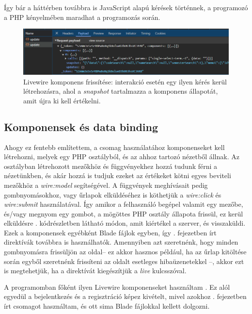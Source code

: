 \documentclass[
]{thesis-ekf}
\theoremstyle{definition}
\theoremstyle{remark}
\begin{document}
Így bár a háttérben továbbra is JavaScript alapú kérések történnek, a programozó a PHP kényelmében maradhat a programozás során.

\begin{figure}[ht!]
	\centering
	\includegraphics[width=15cm]{../pictures/screenshots/livewire_update.png}
	\caption{Livewire komponens frissítése: interakció esetén egy ilyen kérés kerül létrehozásra, ahol a \emph{snapshot} tartalmazza a komponens állapotát, amit újra ki kell értékelni.}
	\label{livewireUpdate}
\end{figure}

\subsection{Komponensek és data binding}

Ahogy ez fentebb említettem, a csomag használatához komponenseket kell létrehozni, melyek egy PHP osztályból, és az ahhoz tartozó nézetből állnak. Az osztályban létrehozott mezőkhöz és függvényekhez hozzá tudunk férni a nézetünkben, és akár hozzá is tudjuk ezeket az értékeket kötni egyes beviteli mezőkhöz a \emph{wire:model} segítségével. A függvények meghívásait pedig gombnyomásokhoz, vagy űrlapok elküldéséhez is köthetjük a \emph{wire:click} és \emph{wire:submit} használatával. Így amikor a felhasználó begépel valamit egy mezőbe, és/vagy megnyom egy gombot, a mögöttes PHP osztály állapota frissül, ez kerül elküldésre . kódrészletben látható módon, amit kiértékel a szerver, és visszaküldi. Ezek a komponensek egyébként Blade fájlok egyben, így . fejezetben írt direktívák továbbra is használhatók. Amennyiben azt szeretnénk, hogy minden  gombnyomásra frissüljön az oldal-- ez akkor hasznos például, ha az űrlap kitöltése során egyből szeretnénk frissíteni az oldalt esetleges hibaüzenetekkel --, akkor ezt is megtehetjük, ha a direktívát kiegészítjük a \emph{live} kulcsszóval.



A programomban főként ilyen Livewire komponenseket használtam . Ez alól egyedül a bejelentkezés és a regisztráció képez kivételt, mivel azokhoz . fejezetben írt csomagot használtam, és ott sima Blade fájlokkal kellett dolgozni.
\end{document}
